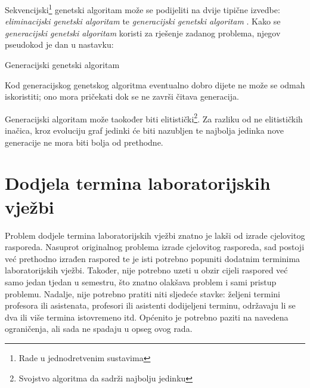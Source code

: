 \documentclass[times, utf8, zavrsni]{fer}
\begin{document}
Sekvencijski\footnote{Rade u jednodretvenim sustavima} genetski algoritam može se podijeliti na dvije tipične izvedbe: \emph{eliminacijski genetski algoritam}  te \emph{generacijski genetski algoritam}  \citep{cupic-disertacija}. Kako se \emph{generacijski genetski algoritam} koristi za rješenje zadanog problema, njegov pseudokod je dan u nastavku:

\begin{algorithm}
\caption{Generacijski genetski algoritam}
\label{algo:generational-algo}
\begin{algorithmic}
\ENDFOR
{}
\ENDFOR
{}
\end{algorithmic}
\end{algorithm}

\newpage

\begin{algorithm}
\begin{algorithmic}
\ENDWHILE
\end{algorithmic}
\end{algorithm}

Kod generacijskog genetskog algoritma eventualno dobro dijete ne može se odmah iskoristiti; ono mora pričekati dok se ne završi čitava generacija.

Generacijski algoritam može taokođer biti elitistički\footnote{Svojstvo algoritma da sadrži najbolju jedinku}. Za razliku od ne elitističkih inačica, kroz evoluciju graf jedinki će biti nazubljen te najbolja jedinka nove generacije ne mora biti bolja od prethodne. \citep{cupic-skripta}

\chapter{Dodjela termina laboratorijskih vježbi}
\label{ch:glavni}

Problem dodjele termina laboratorijskih vježbi znatno je lakši od izrade cjelovitog rasporeda. Nasuprot originalnog problema izrade cjelovitog rasporeda, sad postoji već prethodno izrađen raspored te je isti potrebno popuniti dodatnim terminima laboratorijskih vježbi. Također, nije potrebno uzeti u obzir cijeli raspored već samo jedan tjedan u semestru, što znatno olakšava problem i sami pristup problemu. Nadalje, nije potrebno pratiti niti sljedeće stavke: željeni termini profesora ili asistenata, profesori ili asistenti dodijeljeni terminu, održavaju li se dva ili više termina istovremeno itd. Općenito je potrebno paziti na navedena ograničenja, ali sada ne spadaju u opseg ovog rada.
\end{document}
